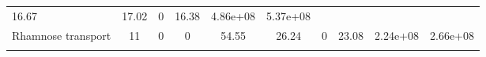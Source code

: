 \documentclass[]{article}
\begin{document}
\begin{longtable}[]{@{}lccccccccc@{}}
\begin{minipage}[t]{0.08\columnwidth}
16.67\strut
\end{minipage} & \begin{minipage}[t]{0.08\columnwidth}\centering\strut
17.02\strut
\end{minipage} & \begin{minipage}[t]{0.08\columnwidth}\centering\strut
0\strut
\end{minipage} & \begin{minipage}[t]{0.08\columnwidth}\centering\strut
16.38\strut
\end{minipage} & \begin{minipage}[t]{0.08\columnwidth}\centering\strut
4.86e+08\strut
\end{minipage} & \begin{minipage}[t]{0.08\columnwidth}\centering\strut
5.37e+08\strut
\end{minipage}\tabularnewline
\begin{minipage}[t]{0.07\columnwidth}\raggedright\strut
Rhamnose transport\strut
\end{minipage} & \begin{minipage}[t]{0.06\columnwidth}\centering\strut
11\strut
\end{minipage} & \begin{minipage}[t]{0.08\columnwidth}\centering\strut
0\strut
\end{minipage} & \begin{minipage}[t]{0.08\columnwidth}\centering\strut
0\strut
\end{minipage} & \begin{minipage}[t]{0.08\columnwidth}\centering\strut
54.55\strut
\end{minipage} & \begin{minipage}[t]{0.08\columnwidth}\centering\strut
26.24\strut
\end{minipage} & \begin{minipage}[t]{0.08\columnwidth}\centering\strut
0\strut
\end{minipage} & \begin{minipage}[t]{0.08\columnwidth}\centering\strut
23.08\strut
\end{minipage} & \begin{minipage}[t]{0.08\columnwidth}\centering\strut
2.24e+08\strut
\end{minipage} & \begin{minipage}[t]{0.08\columnwidth}\centering\strut
2.66e+08\strut
\end{minipage}\tabularnewline
\begin{minipage}[t]{0.07\columnwidth}\raggedright\strut

\end{minipage}
\end{longtable}
\end{document}
